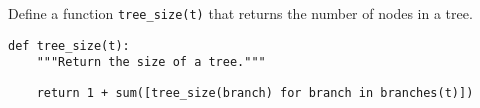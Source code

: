 \question
Define a function \texttt{tree\_size(t)} that returns the number of nodes in a
tree.
\begin{lstlisting}
def tree_size(t):
    """Return the size of a tree."""
\end{lstlisting}
\begin{solution}[2in]
\begin{lstlisting}
    return 1 + sum([tree_size(branch) for branch in branches(t)])
\end{lstlisting}
\end{solution}

